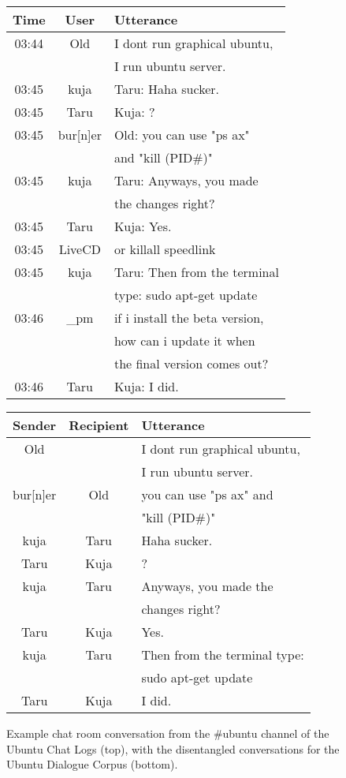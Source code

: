 \documentclass[11pt,a4paper]{article}
\begin{document}
\begin{figure}[h!]
\centering
\scriptsize
\begin{tabular}{|c |c |l|} \hline
Time & User & Utterance \\ \hline \hline
03:44& Old& I dont run graphical ubuntu,\\&& I run ubuntu server. \\ \hline
03:45& kuja& Taru: Haha sucker.\\ \hline
03:45& Taru &Kuja: ?\\ \hline
03:45& bur[n]er& Old: you can use "ps ax" \\&&and "kill (PID\#)"\\ \hline
03:45& kuja& Taru: Anyways, you made \\&& the changes right?\\ \hline
03:45& Taru& Kuja: Yes.\\ \hline
03:45& LiveCD& or killall speedlink\\ \hline
03:45& kuja& Taru: Then from the terminal\\&& type:  sudo apt-get update\\ \hline
03:46& \_pm& if i install the beta version, \\&& how can i update it when \\&& the final version comes out? \\ \hline
03:46& Taru& Kuja: I did.\\ \hline 
\end{tabular}
\begin{tabular}{|c |c |l|}  \hline
Sender & Recipient & Utterance \\ \hline \hline
Old& & I dont run graphical ubuntu,\\&& I run ubuntu server. \\ \hline
bur[n]er& Old& you can use "ps ax" and \\&& "kill (PID\#)"\\ \hline \hline
kuja& Taru& Haha sucker.\\ \hline
 Taru &Kuja& ?\\ \hline
kuja& Taru& Anyways, you made the \\&& changes right?\\ \hline
Taru& Kuja& Yes.\\ \hline
kuja& Taru& Then from the terminal type:\\&&   sudo apt-get update\\ \hline
Taru& Kuja& I did.\\ \hline 
\end{tabular}
\caption{\label{fig:sample-chat}Example chat room conversation from the \#ubuntu channel of the Ubuntu Chat Logs (top), with the disentangled conversations for the Ubuntu Dialogue Corpus (bottom).}
\end{figure}
\end{document}
